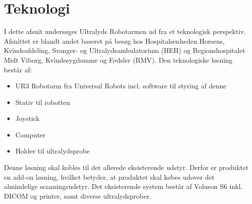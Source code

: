\chapter{Teknologi}
I dette afsnit undersøges Ultralyds Robotarmen ud fra et teknologisk perspektiv. Afsnittet er blandt andet baseret på besøg hos Hospitalsenheden Horsens, Kvindeafdeling, Svanger- og Ultralydsambulatorium (HEH) og Regionshospitalet Midt Viborg, Kvindesygdomme og Fødsler (RMV). Den teknologiske løsning består af:
\begin{itemize}
\item UR3 Robotarm fra Universal Robots incl. software til styring af denne
\item Stativ til robotten
\item Joystick
\item Computer
\item Holder til ultralydsprobe
\end{itemize}
Denne løsning skal kobles til det allerede eksisterende udstyr. Derfor er produktet en add-on løsning, hvilket betyder, at produktet skal købes udover det almindelige scanningsudstyr. Det eksisterende system består af Voluson S6 inkl. DICOM og printer, samt diverse ultralydsprober.  

